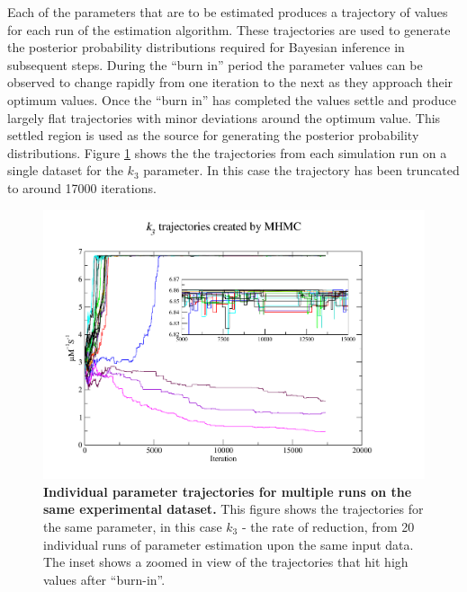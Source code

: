Each of the parameters that are to be estimated produces a trajectory of values for each run of the estimation algorithm. These trajectories are used to generate the posterior probability distributions required for Bayesian inference in subsequent steps. During the ``burn in'' period the parameter values can be observed to change rapidly from one iteration to the next as they approach their optimum values. Once the ``burn in'' has completed the values settle and produce largely flat trajectories with minor deviations around the optimum value. This settled region is used as the source for generating the posterior probability distributions. Figure \ref{fig:k3s} shows the the trajectories from each simulation run on a single dataset for the $k_3$ parameter. In this case the trajectory has been truncated to around 17000 iterations.

\begin{figure}[tbp]
 \centering
 \includegraphics[width=14cm, trim=75px 50px 125px 25px]{./05-oxygenreduction/data/k3s.pdf}
 \caption[Individual parameter trajectories for multiple runs on the same experimental dataset]{{\bf Individual parameter trajectories for multiple runs on the same experimental dataset.} This figure shows the trajectories for the same parameter, in this case $k_3$ - the rate of \cbbthree{} reduction, from 20 individual runs of parameter estimation upon the same input data. The inset shows a zoomed in view of the trajectories that hit high values after ``burn-in''.
 \label{fig:k3s}}
\end{figure}

